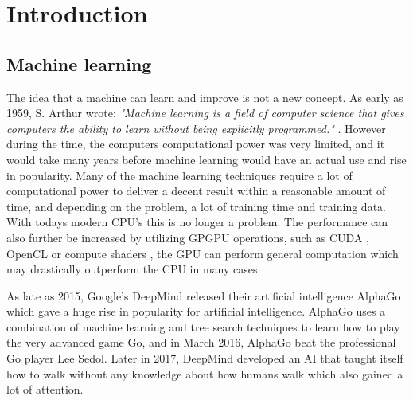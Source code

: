 \documentclass[fleqn,10pt]{SelfArx} %
\begin{document}
\flushbottom %

\maketitle %

\tableofcontents %

\thispagestyle{empty} %


\section{Introduction} %

\subsection{Machine learning}
The idea that a machine can learn and improve is not a new concept. As early as 1959, S. Arthur wrote: \textit{"Machine learning is a field of computer science that gives computers the ability to learn without being explicitly programmed."} \cite{SamArthur}. However during the time, the computers computational power was very limited, and it would take many years before machine learning would have an actual use and rise in popularity. 
Many of the machine learning techniques require a lot of computational power to deliver a decent result within a reasonable amount of time, and depending on the problem, a lot of training time and training data. With todays modern CPU's this is no longer a problem. The performance can also further be increased by utilizing GPGPU operations, such as CUDA \cite{cuda}, OpenCL \cite{opencl} or compute shaders \cite{computeshader}, the GPU can perform general computation which may drastically outperform the CPU in many cases. 

As late as 2015, Google's DeepMind released their artificial intelligence AlphaGo \cite{alphago} which gave a huge rise in popularity for artificial intelligence. AlphaGo uses a combination of machine learning and tree search techniques to learn how to play the very advanced game Go, and in March 2016, AlphaGo beat the professional Go player Lee Sedol. Later in 2017, DeepMind developed an AI that taught itself how to walk without any knowledge about how humans walk which also gained a lot of attention. \cite{deepmindWalking}
\end{document}
